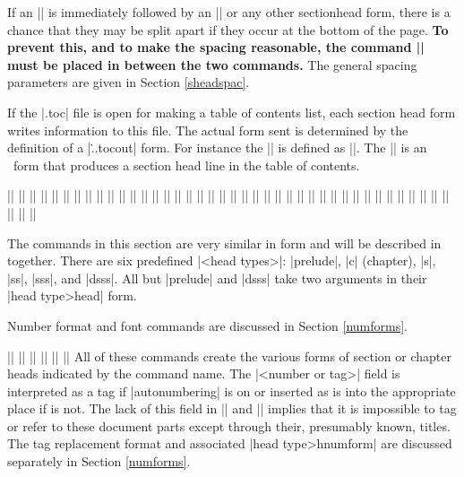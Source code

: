 If an |\shead| is immediately followed by an |\sshead| or any other
sectionhead form, there is a chance that they may be split apart if they
occur at the bottom of the page. {\bf To prevent this, and to
make the spacing reasonable,  the command
|\nosheadbreak| must be placed in between the two commands.}
The general spacing parameters are given in Section \ref{sheadspac}.

If the |.toc| file is open for making a table of contents list, each section
head form writes information to this file. The actual form sent is determined
by the definition of a |\...tocout| form. For instance the |\shtocout| is
defined as |\def\shtocout{\string\shtoc}|. The |\shtoc| is an \intex\ form
that produces a section head line in the table of contents. 


\beginthreecolumn
\hfuzz=10pt
\ext|\Alphabetic|
\ext|\alphabetic|
\ext|\Appendix|
\ext|\beginappendices|
\ext|\beginprelude|
\ext|\Chapter|
\ext|\chapterstartform|
\ext|\chead|
\ext|\cheadfont|
\ext|\chnum|
\ext|\chtagreplaceformat|
\ext|\chnumform|
\ext|\chtocout|
\ext|\endappendices|
\ext|\endprelude|
\ext|\dssshead|
\ext|\dsssheadfont|
\ext|\dssshtocout|
\ext|\innerchead|
\ext|\innerdssshead|
\ext|\innershead|
\ext|\innersshead|
\ext|\innerssshead|
\ext|\nosheadbreak|
\ext|\preludehead|
\ext|\prtocout|
\ext|\shead|
\ext|\sheadfont|
\ext|\shnum|
\ext|\shnumform|
\ext|\shtagreplaceformat|
\ext|\shtocout|
\ext|\sshead|
\ext|\ssheadfont|
\ext|\sshnum|
\ext|\sshnumform|
\ext|\sshtocout|
\ext|\ssshead|
\ext|\sssheadfont|
\ext|\ssshnum|
\ext|\ssshnumform|
\ext|\ssshtocout|
\ext|\UpperRoman|
\endthreecolumn

The commands in this section are very similar in form  and will be described
in together. There are six predefined |<head types>|: |prelude|, |c| 
(chapter),
|s|, |ss|, |sss|, and |dsss|. All but |prelude| and |dsss| take two arguments
in their |\<head type>head| form. 

Number format and font commands  are discussed in Section \ref{numforms}.

\beginblockmode
\mbr
\ext\@||
\nbr
\ext\@||
\nbr
\ext\@||
\nbr
\ext\@||
\nbr
\ext\@||
\nbr
\ext\@||
\nbr
All of these commands create the various forms of section or chapter heads
indicated by the command name. The |<number or tag>| field is interpreted as a
tag if |autonumbering| is on or inserted as is into the appropriate place if
is not. The lack of this field in |\dssshead| and |\preludehead| implies that
it is impossible to tag or refer to these document parts except through
their, presumably known, titles. The tag replacement format  and associated 
|\<head type>hnumform| are 
discussed separately in
Section \ref{numforms}. 

